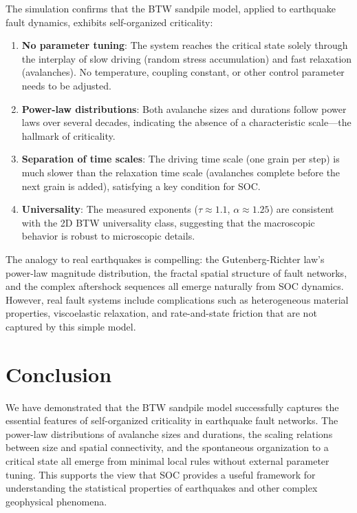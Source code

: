 \documentclass[12pt,a4paper]{article}
\begin{document}
The simulation confirms that the BTW sandpile model, applied to earthquake
fault dynamics, exhibits self-organized criticality:

\begin{enumerate}
    \item \textbf{No parameter tuning}: The system reaches the critical state
          solely through the interplay of slow driving (random stress
          accumulation) and fast relaxation (avalanches). No temperature,
          coupling constant, or other control parameter needs to be adjusted.
    \item \textbf{Power-law distributions}: Both avalanche sizes and durations
          follow power laws over several decades, indicating the absence of
          a characteristic scale---the hallmark of criticality.
    \item \textbf{Separation of time scales}: The driving time scale (one grain
          per step) is much slower than the relaxation time scale (avalanches
          complete before the next grain is added), satisfying a key condition
          for SOC.
    \item \textbf{Universality}: The measured exponents ($\tau \approx 1.1$,
          $\alpha \approx 1.25$) are consistent with the 2D BTW universality
          class, suggesting that the macroscopic behavior is robust to
          microscopic details.
\end{enumerate}

The analogy to real earthquakes is compelling: the Gutenberg-Richter law's
power-law magnitude distribution, the fractal spatial structure of fault
networks, and the complex aftershock sequences all emerge naturally from
SOC dynamics. However, real fault systems include complications such as
heterogeneous material properties, viscoelastic relaxation, and
rate-and-state friction that are not captured by this simple model.

\section{Conclusion}

We have demonstrated that the BTW sandpile model successfully captures
the essential features of self-organized criticality in earthquake fault
networks. The power-law distributions of avalanche sizes and durations,
the scaling relations between size and spatial connectivity, and the
spontaneous organization to a critical state all emerge from minimal
local rules without external parameter tuning. This supports the view
that SOC provides a useful framework for understanding the statistical
properties of earthquakes and other complex geophysical phenomena.
\end{document}
